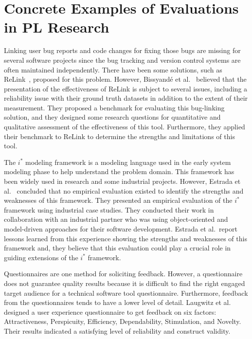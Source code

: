 \section{Concrete Examples of Evaluations in PL Research}

Linking user bug reports and code changes for fixing those bugs are missing for several software projects since the bug tracking and version control systems are often maintained independently. There have been some solutions, such as ReLink~\cite{relink}, proposed for this problem. However, Bissyandé et al.~\cite{ee_buglinking} believed that the presentation of the effectiveness of ReLink is subject to several issues, including a reliability issue with their ground truth datasets in addition to the extent of their measurement. They proposed a benchmark for evaluating this bug-linking solution, and they designed some research questions for quantitative and qualitative assessment of the effectiveness of this tool. Furthermore, they applied their benchmark to ReLink to determine the strengths and limitations of this tool.

The $i^*$ modeling framework is a modeling language used in the early system modeling phase to help understand the problem domain. This framework has been widely used in research and some industrial projects. However, Estrada et al.~\cite{ee_framework} concluded that no empirical evaluation existed to identify the strengths and weaknesses of this framework. They presented an empirical evaluation of the $i^*$ framework using industrial case studies. They conducted their work in collaboration with an industrial partner who was using object-oriented and model-driven approaches for their software development. Estrada et al.\ report lessons learned from this experience showing the strengths and weaknesses of this framework and, they believe that this evaluation could play a crucial role in guiding extensions of the $i^*$ framework.

Questionnaires are one method for soliciting feedback. However, a questionnaire does not guarantee quality results because it is difficult to find the right engaged target audience for a technical software tool questionnaire. Furthermore, feedback from the questionnaires tends to have a lower level of detail.
Laugwitz et al.~\cite{laugwitz2008construction} designed a user experience questionnaire to get feedback on six factors: Attractiveness, Perspicuity, Efficiency, Dependability, Stimulation, and Novelty. Their results indicated a satisfying level of reliability and construct validity.

